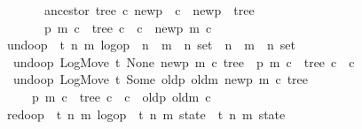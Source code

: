 \documentclass[10pt,journal,compsoc]{IEEEtran}
\renewcommand{\isacartoucheopen}{}
\renewcommand{\isacartoucheclose}{}
\begin{document}
\begin{figure}
\begin{isabellebody}
\ \ \ \ \ \ \ ancestor\ tree\ c\ newp\ {\isasymor}\ c\ {\isacharequal}\ newp\ \ tree\isanewline
\ \ \ \ \ \ \ {\isacharbraceleft}{\isacharparenleft}p{\isacharprime}{\isacharcomma}\ m{\isacharprime}{\isacharcomma}\ c{\isacharprime}{\isacharparenright}\ {\isasymin}\ tree{\isachardot}\ c{\isacharprime}\ {\isasymnoteq}\ c{\isacharbraceright}\ {\isasymunion}\ {\isacharbraceleft}{\isacharparenleft}newp{\isacharcomma}\ m{\isacharcomma}\ c{\isacharparenright}{\isacharbraceright}{\isacharparenright}{\isacartoucheclose}\isanewline
\isanewline
{}\isamarkupfalse%
\ undo{\isacharunderscore}op\ {\isacharcolon}{\isacharcolon}\ {\isacartoucheopen}{\isacharparenleft}{\isacharprime}t{\isacharcomma}\ {\isacharprime}n{\isacharcomma}\ {\isacharprime}m{\isacharparenright}\ log{\isacharunderscore}op\ {\isasymtimes}\ {\isacharparenleft}{\isacharprime}n\ {\isasymtimes}\ {\isacharprime}m\ {\isasymtimes}\ {\isacharprime}n{\isacharparenright}\ set\ {\isasymRightarrow}\ {\isacharparenleft}{\isacharprime}n\ {\isasymtimes}\ {\isacharprime}m\ {\isasymtimes}\ {\isacharprime}n{\isacharparenright}\ set{\isacartoucheclose}\ \isanewline
    \ \ {\isacartoucheopen}undo{\isacharunderscore}op\ {\isacharparenleft}{\rm LogMove}\ t\ {\rm None}\ newp\ m\ c{\isacharcomma}\ tree{\isacharparenright}\ {\isacharequal}\ {\isacharbraceleft}{\isacharparenleft}p{\isacharprime}{\isacharcomma}\ m{\isacharprime}{\isacharcomma}\ c{\isacharprime}{\isacharparenright}\ {\isasymin}\ tree{\isachardot}\ c{\isacharprime}\ {\isasymnoteq}\ c{\isacharbraceright}{\isacartoucheclose}\ {\isacharbar}\isanewline
\ \ {\isacartoucheopen}undo{\isacharunderscore}op\ {\isacharparenleft}{\rm LogMove}\ t\ {\isacharparenleft}{\rm Some}\ {\isacharparenleft}oldp{\isacharcomma}\ oldm{\isacharparenright}{\isacharparenright}\ newp\ m\ c{\isacharcomma}\ tree{\isacharparenright}\ {\isacharequal}\isanewline
\ \ \ \ \ {\isacharbraceleft}{\isacharparenleft}p{\isacharprime}{\isacharcomma}\ m{\isacharprime}{\isacharcomma}\ c{\isacharprime}{\isacharparenright}\ {\isasymin}\ tree{\isachardot}\ c{\isacharprime}\ {\isasymnoteq}\ c{\isacharbraceright}\ {\isasymunion}\ {\isacharbraceleft}{\isacharparenleft}oldp{\isacharcomma}\ oldm{\isacharcomma}\ c{\isacharparenright}{\isacharbraceright}{\isacartoucheclose}\isanewline
\isanewline
{}\isamarkupfalse%
\ redo{\isacharunderscore}op\ {\isacharcolon}{\isacharcolon}\ {\isacartoucheopen}{\isacharparenleft}{\isacharprime}t{\isacharcomma}\ {\isacharprime}n{\isacharcomma}\ {\isacharprime}m{\isacharparenright}\ log{\isacharunderscore}op\ {\isasymRightarrow}\ {\isacharparenleft}{\isacharprime}t{\isacharcomma}\ {\isacharprime}n{\isacharcomma}\ {\isacharprime}m{\isacharparenright}\ state\ {\isasymRightarrow}\ {\isacharparenleft}{\isacharprime}t{\isacharcomma}\ {\isacharprime}n{\isacharcomma}\ {\isacharprime}m{\isacharparenright}\ state{\isacartoucheclose}\ \isanewline

\end{isabellebody}
\end{figure}
\end{document}

